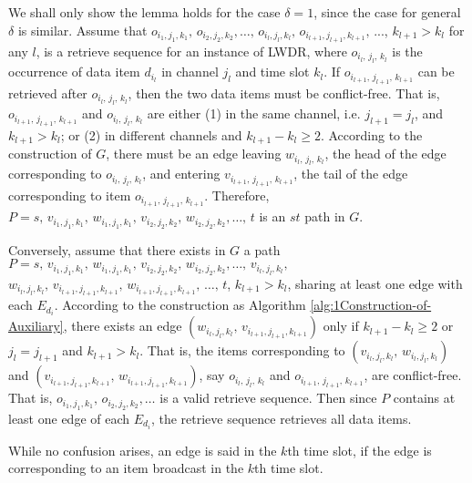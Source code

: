 \documentclass[11pt,english,onecolumn,draftcls]{IEEEtran}
\theoremstyle{plain}
\theoremstyle{plain}
\theoremstyle{plain}
\theoremstyle{plain}
\begin{document}
\begin{IEEEproof}
We shall only show the lemma holds for the case $\delta=1$, since
the case for general $\delta$ is similar. Assume that $o_{i_{1},j_{1},k_{1}},\, o_{i_{2},j_{2},k_{2}},\dots,\, o_{i_{l},j_{l},k_{l}},\, o_{i_{l+1},j_{l+1},k_{l+1}},\,...$,
$k_{l+1}>k_{l}$ for any $l$, is a retrieve sequence for an instance
of LWDR, where $o_{i_{l},\, j_{l},\, k_{l}}$ is the occurrence of
data item $d_{i_{l}}$ in channel $j_{l}$ and time slot $k_{l}$.
If $o_{i_{l+1},\, j_{l+1},\, k_{l+1}}$ can be retrieved after $o_{i_{l},\, j_{l},\, k_{l}}$,
then the two data items must be conflict-free. That is, $o_{i_{l+1},\, j_{l+1},\, k_{l+1}}$
and $o_{i_{l},\, j_{l},\, k_{l}}$ are either (1) in the same channel,
i.e. $j_{l+1}=j_{l}$, and $k_{l+1}>k_{l}$; or (2) in different channels
and $k_{l+1}-k_{l}\geq2$. According to the construction of $G$,
there must be an edge leaving $w{}_{i_{l},\, j_{l},\, k_{l}}$, the
head of the edge corresponding to $o_{i_{l},\, j_{l},\, k_{l}}$,
and entering $v{}_{i_{l+1},\, j_{l+1},\, k_{l+1}}$, the tail of the
edge corresponding to item $o_{i_{l+1},\, j_{l+1},\, k_{l+1}}$. Therefore,
$P=s,\, v_{i_{1},j_{1},k_{1}},\, w_{i_{1},j_{1},k_{1}},\, v_{i_{2},j_{2},k_{2}},\, w_{i_{2},j_{2},k_{2}},\dots,\, t$
is an $st$ path in $G$.

Conversely, assume that there exists in $G$ a path $P=s,\, v_{i_{1},j_{1},k_{1}},\, w_{i_{1},j_{1},k_{1}},\, v_{i_{2},j_{2},k_{2}},\, w_{i_{2},j_{2},k_{2}},\dots,\, v_{i_{l},j_{l},k_{l}},$ $w_{i_{l},j_{l},k_{l}},\,
v_{i_{l+1},j_{l+1},k_{l+1}},\, w_{i_{l+1},j_{l+1},k_{l+1}},\,\dots,\, t$,
$k_{l+1}>k_{l}$, sharing at least one edge with each $E_{d_{i}}$.
According to the construction as Algorithm \ref{alg:1Construction-of-Auxiliary},
there exists an edge $(w{}_{i_{l},j_{l},k_{l}},\, v{}_{i_{l+1},j_{l+1},k_{l+1}})$
only if $k_{l+1}-k_{l}\geq2$ or $j_{l}=j_{l+1}$ and $k_{l+1}>k_{l}$.
That is, the items corresponding to $(v_{i_{l},j_{l},k_{l}},\, w_{i_{l},j_{l},k_{l}})$
and $(v_{i_{l+1},j_{l+1},k_{l+1}},\, w_{i_{l+1},j_{l+1},k_{l+1}})$,
say $o_{i_{l},\, j_{l},\, k_{l}}$ and $o_{i_{l+1},\, j_{l+1},\, k_{l+1}}$,
are conflict-free. That is, $o_{i_{1},j_{1},k_{1}},\, o_{i_{2},j_{2},k_{2}},\dots$
is a valid retrieve sequence. Then since $P$ contains at least one
edge of each $E_{d_{i}}$, the retrieve sequence retrieves all data
items.
\end{IEEEproof}
While no confusion arises, an edge is said in the $k$th time slot,
if the edge is corresponding to an item broadcast in the $k$th time
slot.
\end{document}
